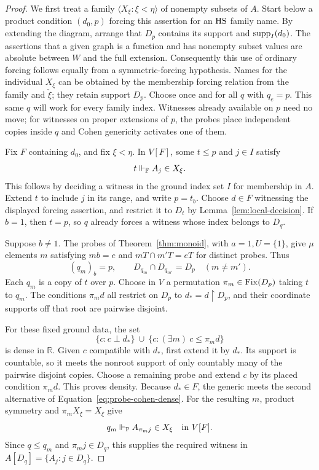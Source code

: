 \begin{proof}
We first treat a family
\(\langle X_\xi:\xi<\eta\rangle\) of nonempty subsets of \(A\).
Start below a product condition \((d_0,p)\) forcing this
assertion for an \(\mathrm{HS}\) family name.
By extending the diagram, arrange that \(D_p\) contains its
support and \(\operatorname{supp}_I(d_0)\).
The assertions that a given graph is a function and has nonempty
subset values are absolute between \(W\) and the full extension.
Consequently this use of ordinary forcing follows equally from
a symmetric-forcing hypothesis.
Names for the individual \(X_\xi\) can be obtained by the
membership forcing relation from the family and \(\check\xi\);
they retain support \(D_p\).
Choose once and for all \(q\) with \(q_e=p\).
This same \(q\) will work for every family index.  Witnesses already
available on \(p\) need no move; for witnesses on proper extensions
of \(p\), the probes place independent copies inside \(q\) and
Cohen genericity activates one of them.

Fix \(F\) containing \(d_0\), and fix \(\xi<\eta\).
In \(V[F]\), some \(t\leq p\) and \(j\in I\) satisfy
\[
 t\Vdash_{\mathbb P} A_j\in X_\xi.
\]
This follows by deciding a witness in the ground index set \(I\)
for membership in \(A\).
Extend \(t\) to include \(j\) in its range, and write \(p=t_b\).
Choose \(d\in F\) witnessing the displayed forcing assertion,
and restrict it to \(D_t\) by
Lemma~\ref{lem:local-decision}.
If \(b=1\), then \(t=p\), so \(q\) already forces a witness
whose index belongs to \(D_q\).

Suppose \(b\neq1\).
The probes of Theorem~\ref{thm:monoid}, with \(a=1,U=\{1\}\),
give \(\mu\) elements \(m\) satisfying \(mb=e\) and
\(mT\cap m'T=eT\) for distinct probes.
Thus
\[
 (q_m)_b=p,\qquad
 D_{q_m}\cap D_{q_{m'}}=D_p\quad(m\neq m').
\]
Each \(q_m\) is a copy of \(t\) over \(p\).
Choose in \(V\) a permutation \(\pi_m\in\operatorname{Fix}(D_p)\) taking
\(t\) to \(q_m\).
The conditions \(\pi_m d\) all restrict on \(D_p\) to
\(d_*=d\restriction D_p\), and their coordinate supports off
that root are pairwise disjoint.

For these fixed ground data, the set
\begin{equation}\label{eq:probe-cohen-dense}
 \{c:c\perp d_*\}\ \cup\
 \{c:(\exists m)\ c\leq\pi_m d\}
\end{equation}
is dense in \(\mathbb R\).
Given \(c\) compatible with \(d_*\), first extend it by \(d_*\).
Its support is countable, so it meets the nonroot support of
only countably many of the pairwise disjoint copies.
Choose a remaining probe and extend \(c\) by its placed
condition \(\pi_m d\).
This proves density.
Because \(d_*\in F\), the generic meets the second alternative
of Equation~\eqref{eq:probe-cohen-dense}.
For the resulting \(m\), product symmetry and
\(\pi_m X_\xi=X_\xi\) give
\[
 q_m\Vdash_{\mathbb P} A_{\pi_mj}\in X_\xi
 \quad\text{in }V[F].
\]
Since \(q\leq q_m\) and \(\pi_mj\in D_q\), this supplies the
required witness in \(A[D_q]=\{A_j:j\in D_q\}\).


\end{proof}
